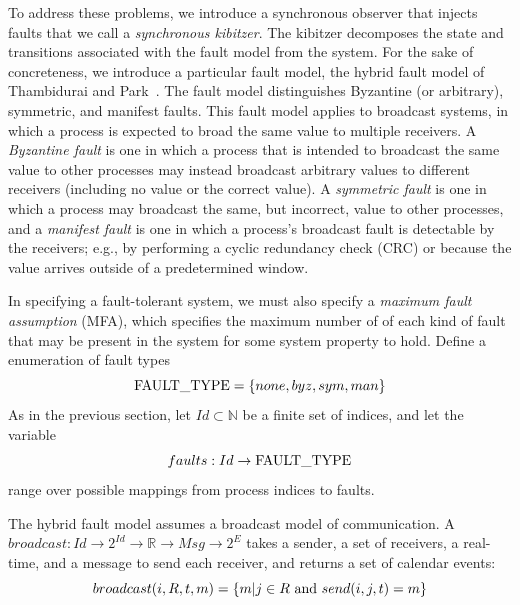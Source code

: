 \documentclass{llncs/llncs}
\newcommand{\lee}[1]{ } %
\newcommand{\lee}[1]{ {\color{blue}$<$lee: #1$>$} } %
\begin{document}
To address these problems, we introduce a synchronous observer that injects faults that we call a \emph{synchronous kibitzer}. The kibitzer decomposes the state and transitions associated with the fault model from the system. For the sake of concreteness, we introduce a particular fault model, the hybrid fault model of Thambidurai and Park~\cite{}. The fault model distinguishes Byzantine (or arbitrary), symmetric, and manifest faults. This fault model applies to broadcast systems, in which a process is expected to broad the same value to multiple receivers. A \emph{Byzantine fault} is one in which a process that is intended to broadcast the same value to other processes may instead broadcast arbitrary values to different receivers (including no value or the correct value). A \emph{symmetric fault} is one in which a process may broadcast the same, but incorrect, value to other processes, and a \emph{manifest fault} is one in which a process's broadcast fault is detectable by the receivers; e.g., by performing a cyclic redundancy check (CRC) or because the value arrives outside of a predetermined window.

In specifying a fault-tolerant system, we must also specify a \emph{maximum fault assumption} (MFA), which specifies the maximum number of of each kind of fault that may be present in the system for some system property to hold. Define a enumeration of fault types $$\textnormal{FAULT\_TYPE} = \{none, byz, sym, man\}$$ As in the previous section, let $Id \subset \mathbb{N}$ be a finite set of indices, and let the variable $$faults: Id \rightarrow \textnormal{FAULT\_TYPE}$$ range over possible mappings from process indices to faults.

The hybrid fault model assumes a broadcast model of communication.
A $broadcast: Id \rightarrow 2^{Id} \rightarrow \mathbb{R} \rightarrow Msg \rightarrow 2^{E}$ takes a sender, a set of receivers, a real-time, and a message to send each receiver, and returns a set of calendar events:
$$broadcast(i, R, t, m) = \{m | j \in R \textnormal{ and } send(i, j, t) = m\}$$

\lee{msg in SAL is recv here}
\end{document}
